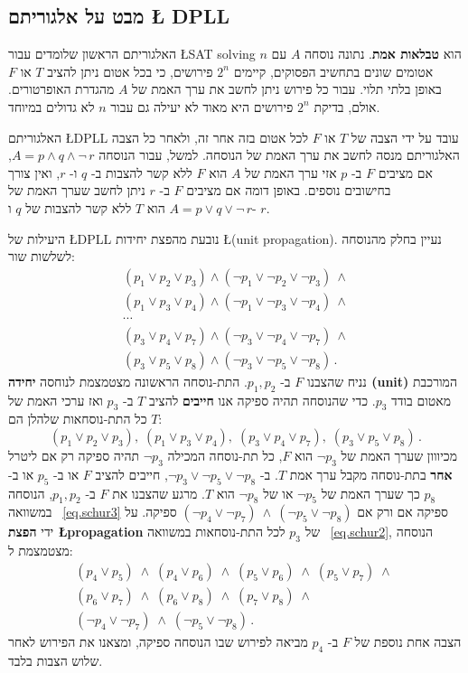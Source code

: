 \subsection{מבט על אלגוריתם \L{ DPLL}}

האלגוריתם הראשון שלומדים עבור
\L{SAT solving}
הוא
\textbf{טבלאות אמת}.
נתונה נוסחה 
$A$
עם 
$n$
אטומים שונים בתחשיב הפסוקים, קיימים
$2^n$
פירושים, כי בכל אטום ניתן להציב
$T$
או
$F$
באופן בלתי תלוי. עבור כל פירוש ניתן לחשב את ערך האמת של
$A$
מהגדרת האופרטורים. אולם, בדיקת
$2^n$
פירושים היא מאוד לא יעילה גם עבור
$n$
לא גדולים במיוחד.

האלגוריתם
\L{DPLL}
עובד על ידי הצבה של
$T$
או
$F$
לכל אטום בזה אחר זה, ולאחר כל הצבה האלגוריתם מנסה לחשב את ערך האמת של הנוסחה. למשל, עבור הנוסחה
$A=p \wedge q \wedge \neg\, r$,
אם מציבים
$F$
ב-%
$p$
אזי ערך האמת של
$A$
הוא
$F$
ללא קשר להצבות ב-%
$q$
ו-%
$r$,
ואין צורך בחישובים נוספים. באופן דומה אם מציבים 
$F$
ב-%
$r$
ניתן לחשב שערך האמת של 
$A=p\vee q \vee \neg\, r$
הוא 
$T$
ללא קשר להצבות של
$q$
ו-%
$r$.

היעילות של
\L{DPLL}
נובעת מהפצת יחידות 
\L{(unit propagation)}.
נעיין בחלק מהנוסחה לשלשות שור:
\begin{equation}
\begin{array}{l}\label{eq.schur3}
(p_1 \vee p_2 \vee p_3) \wedge (\neg p_1 \vee \neg p_2 \vee \neg p_3) \:\wedge \\
(p_1 \vee p_3 \vee p_4) \wedge (\neg p_1 \vee \neg p_3 \vee \neg p_4) \:\wedge \\
\cdots\\
(p_3 \vee p_4 \vee p_7) \wedge (\neg p_3 \vee \neg p_4 \vee \neg p_7) \:\wedge \\
(p_3 \vee p_5 \vee p_8) \wedge (\neg p_3 \vee \neg p_5 \vee \neg p_8)\,.
\end{array}
\end{equation}
נניח שהצבנו
$F$
ב-%
$p_1,p_2$.
התת-נוסחה הראשונה מצטמצמת לנוחסה
\textbf{יחידה (unit)}
המורכבת מאטום בודד
$p_3$.
כדי שהנוסחה תהיה ספיקה אנו
\textbf{חייבים}
להציב 
$T$
ב-%
$p_3$
ואז ערכי האמת של כל התת-נוסחאות שלהלן הם
$T$:
\[
(p_1 \vee p_2 \vee p_3),\;(p_1 \vee p_3 \vee p_4),\;
(p_3 \vee p_4 \vee p_7),\;(p_3 \vee p_5 \vee p_8)\,.
\]
מכיווון שערך האמת של
$\neg p_3$
הוא
$F$,
כל תת-נוסחה המכילה 
$\neg p_3$
תהיה ספיקה רק אם ליטרל
\textbf{אחר}
בתת-נוסחה מקבל ערך אמת
$T$.
ב-%
$\neg p_3 \vee \neg p_5 \vee \neg p_8$, 
חייבים להציב
$F$
או ב-%
$p_5$
או ב-%
$p_8$
כך שערך האמת של
$\neg p_5$
או של
$\neg p_8$
הוא
$T$.
מרגע שהצבנו את
$F$
ב-%
$p_1,p_2$,
הנוסחה במשוואה
~\ref{eq.schur3}
ספיקה אם ורק אם 
$(\neg p_4 \vee \neg p_7) \:\wedge\: (\neg p_5 \vee \neg p_8)$
ספיקה. על ידי
\textbf{הפצת \L{propagation}}
של
$p_3$
לכל התת-נוסחאות במשוואה%
~\ref{eq.schur2}, 
הנוסחה מצטמצמת ל:
\[
\begin{array}{l}
(p_4\vee p_5)\;\wedge\;(p_4\vee p_6)\;\wedge\;(p_5\vee p_6)\;\wedge\;(p_5\vee p_7)\;\wedge\;\\
(p_6\vee p_7)\;\wedge\;(p_6\vee p_8)\;\wedge\;(p_7\vee p_8)\;\wedge\\
(\neg p_4\vee \neg p_7)\;\wedge\;
(\neg p_5\vee \neg p_8)\,.
\end{array}
\]
הצבה אחת נוספת של
$F$
ב-%
$p_4$
מביאה לפירוש שבו הנוסחה ספיקה, ומצאנו את הפירוש לאחר שלוש הצבות בלבד.

